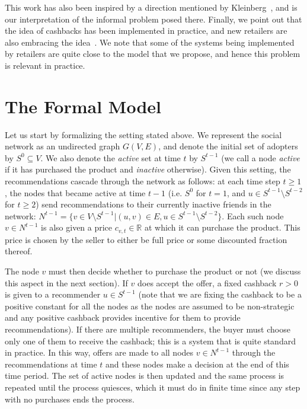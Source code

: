 \documentclass[letterpaper,twoside]{article}
\begin{document}
This work has also been inspired by a direction mentioned by
Kleinberg~\cite{Kleinberg_AGT07}, and is our interpretation of the informal
problem posed there. Finally, we point out that the idea of cashbacks has
been implemented in practice, and new retailers are also embracing the
idea~\cite{LSK06,LAH07,Schon08}. We note that some of the systems being
implemented by retailers are quite close to the model that we propose, and
hence this problem is relevant in practice.

\section{The Formal Model}
\label{sec:model}
Let us start by formalizing the setting stated above. We represent
the social network as an undirected graph $G(V,E)$, and denote the
initial set of adopters by $S^0\subseteq V$. We also denote the
{\em active} set at time $t$ by $S^{t-1}$ (we call a node {\em
active} if it has purchased the product and {\em inactive}
otherwise). Given this setting, the recommendations cascade through
the network as follows: at each time step $t\geq 1$, the nodes that
became active at time $t-1$ (i.e. $S^0$ for $t=1$, and
$u\in S^{t-1}\setminus S^{t-2}$ for $t\geq 2$) send recommendations
to their currently inactive friends in the network: $N^{t-1}=\{v\in V\setminus
S^{t-1}|(u,v)\in E, u\in S^{t-1}\setminus
S^{t-2}\}$. Each such node $v \in N^{t-1}$
is also given a price $c_{v,t}\in\mathbb{R}$ at which it can purchase the
product. This price is chosen by the seller to either be full price
or some discounted fraction thereof.

The node $v$ must then decide whether to purchase the product or not
(we discuss this aspect in the next section). If $v$ does accept the
offer, a fixed cashback $r>0$ is given to a recommender
$u\in S^{t-1}$ (note that we are fixing the cashback to be a positive constant for all
the nodes as the nodes are assumed to be non-strategic and any positive
cashback provides incentive for them to provide recommendations). If there are multiple recommenders, the buyer must
choose only one of them to receive the cashback; this is a system that is
quite standard in practice. In this way, offers are made to all nodes $v\in N^{t-1}$ through
the recommendations at time $t$ and these nodes make a decision at
the end of this time period. The set of active nodes is then updated
and the same process is repeated until the process quiesces, which
it must do in finite time since any step with no purchases ends the
process.
\end{document}
